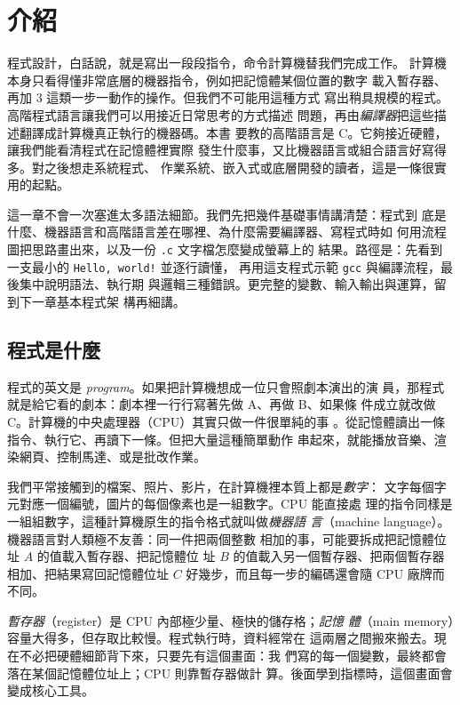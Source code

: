 \chapter{介紹}
\label{ch:introduction}

程式設計，白話說，就是寫出一段段指令，命令計算機替我們完成工作。
計算機本身只看得懂非常底層的機器指令，例如把記憶體某個位置的數字
載入暫存器、再加 $3$ 這類一步一動作的操作。但我們不可能用這種方式
寫出稍具規模的程式。高階程式語言讓我們可以用接近日常思考的方式描述
問題，再由\emph{編譯器}把這些描述翻譯成計算機真正執行的機器碼。本書
要教的高階語言是 C。它夠接近硬體，讓我們能看清程式在記憶體裡實際
發生什麼事，又比機器語言或組合語言好寫得多。對之後想走系統程式、
作業系統、嵌入式或底層開發的讀者，這是一條很實用的起點。

這一章不會一次塞進太多語法細節。我們先把幾件基礎事情講清楚：程式到
底是什麼、機器語言和高階語言差在哪裡、為什麼需要編譯器、寫程式時如
何用流程圖把思路畫出來，以及一份 \texttt{.c} 文字檔怎麼變成螢幕上的
結果。路徑是：先看到一支最小的 \texttt{Hello, world!} 並逐行讀懂，
再用這支程式示範 \texttt{gcc} 與編譯流程，最後集中說明語法、執行期
與邏輯三種錯誤。更完整的變數、輸入輸出與運算，留到下一章基本程式架
構再細講。

\section{程式是什麼}
\label{sec:intro-what-is-programming}

程式的英文是 \emph{program}。如果把計算機想成一位只會照劇本演出的演
員，那程式就是給它看的劇本：劇本裡一行行寫著先做 A、再做 B、如果條
件成立就改做 C。計算機的中央處理器（CPU）其實只做一件很單純的事
。從記憶體讀出一條指令、執行它、再讀下一條。但把大量這種簡單動作
串起來，就能播放音樂、渲染網頁、控制馬達、或是批改作業。

我們平常接觸到的檔案、照片、影片，在計算機裡本質上都是\emph{數字}：
文字每個字元對應一個編號，圖片的每個像素也是一組數字。CPU 能直接處
理的指令同樣是一組組數字，這種計算機原生的指令格式就叫做\emph{機器語
言}（machine language）。機器語言對人類極不友善：同一件把兩個整數
相加的事，可能要拆成把記憶體位址 $A$ 的值載入暫存器、把記憶體位
址 $B$ 的值載入另一個暫存器、把兩個暫存器相加、把結果寫回記憶體位址
$C$ 好幾步，而且每一步的編碼還會隨 CPU 廠牌而不同。

\emph{暫存器}（register）是 CPU 內部極少量、極快的儲存格；\emph{記憶
體}（main memory）容量大得多，但存取比較慢。程式執行時，資料經常在
這兩層之間搬來搬去。現在不必把硬體細節背下來，只要先有這個畫面：我
們寫的每一個變數，最終都會落在某個記憶體位址上；CPU 則靠暫存器做計
算。後面學到指標時，這個畫面會變成核心工具。

